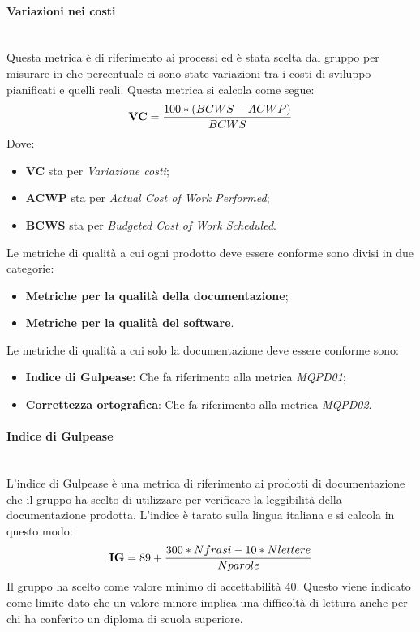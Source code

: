 \paragraph{Variazioni nei costi}\mbox{}\\
Questa metrica è di riferimento ai processi ed è stata scelta dal gruppo per misurare in che percentuale ci sono state variazioni tra i costi di sviluppo pianificati e quelli reali. Questa metrica si calcola come segue:
\begin{align*}
	\centering
	\textbf{VC} = \frac{100 * (BCWS - ACWP)}{BCWS}
\end{align*}
Dove:
\begin{itemize}
	\item \textbf{VC} sta per \textit{Variazione costi};
	\item \textbf{ACWP} sta per \textit{Actual Cost of Work Performed};
	\item \textbf{BCWS} sta per \textit{Budgeted Cost of Work Scheduled}.
\end{itemize}
Le metriche di qualità a cui ogni prodotto deve essere conforme sono divisi in due categorie:
\begin{itemize}
	\item \textbf{Metriche per la qualità della documentazione};
	\item \textbf{Metriche per la qualità del software}.
\end{itemize}
Le metriche di qualità a cui solo la documentazione deve essere conforme sono:
\begin{itemize}
	\item \textbf{Indice di Gulpease}: Che fa riferimento alla metrica \textit{MQPD01};
	\item \textbf{Correttezza ortografica}: Che fa riferimento alla metrica \textit{MQPD02}.
\end{itemize}
\paragraph{Indice di Gulpease}\mbox{}\\
L'indice di Gulpease è una metrica di riferimento ai prodotti di documentazione che il gruppo ha scelto di utilizzare per verificare la leggibilità della documentazione prodotta. L'indice è tarato sulla lingua italiana e si calcola in questo modo:
\begin{align*}
	\centering
	\textbf{IG} = 89 + \frac{300 * Nfrasi - 10 * Nlettere}{Nparole}
\end{align*}
Il gruppo ha scelto come valore minimo di accettabilità 40. Questo viene indicato come limite dato che un valore minore implica una difficoltà di lettura anche per chi ha conferito un diploma di scuola superiore.
